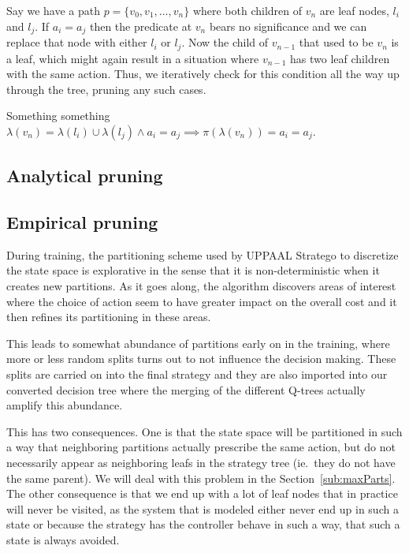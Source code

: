 Say we have a path $p = \{v_0, v_1, \dots, v_n \}$ where both children of $v_n$ 
are leaf nodes, $l_i$ and $l_j$. If $a_i = a_j$ then the predicate at $v_n$
bears no significance and we can replace that node with either $l_i$ or $l_j$.
Now the child of $v_{n-1}$ that used to be $v_n$ is a leaf, which might again
result in a situation where $v_{n-1}$ has two leaf children with the same
action. Thus, we iteratively check for this condition all the way up through the
tree, pruning any such cases.

Something something $\lambda(v_n) = \lambda(l_i) \cup \lambda(l_j) \land a_i =
a_j \implies \pi(\lambda(v_n)) = a_i = a_j$.

\subsection{Analytical pruning}%
\label{sub:anaPrune}

\lipsum[1]


\subsection{Empirical pruning}%
\label{sub:empPrune}

During training, the partitioning scheme used by UPPAAL Stratego to discretize
the state space is explorative in the sense that it is non-deterministic when it
creates new partitions. As it goes along, the algorithm discovers areas of
interest where the choice of action seem to have greater impact on the overall
cost and it then refines its partitioning in these areas.

This leads to somewhat abundance of partitions early on in the training, where
more or less random splits turns out to not influence the decision making. These
splits are carried on into the final strategy and they are also imported into
our converted decision tree where the merging of the different Q-trees actually
amplify this abundance.

This has two consequences. One is that the state space will be partitioned in
such a way that neighboring partitions actually prescribe the same action, but
do not necessarily appear as neighboring leafs in the strategy tree (ie.\ they
do not have the same parent). We will deal with this problem in the
Section~\ref{sub:maxParts}. The other consequence is that we end up with a lot
of leaf nodes that in practice will never be visited, as the system that is
modeled either never end up in such a state or because the strategy has the
controller behave in such a way, that such a state is always avoided.

